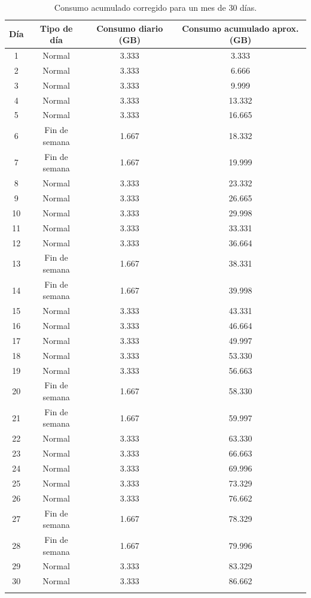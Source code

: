 \documentclass[12pt,a4paper]{article}
\begin{document}
\begin{center}
		\begin{longtable}{|c|c|c|c|}
			\hline
			\rowcolor{azulclaro}
			\textbf{Día} & \textbf{Tipo de día} & \textbf{Consumo diario (GB)} & \textbf{Consumo acumulado aprox. (GB)} \\ \hline
			1 & Normal & 3.333 & 3.333 \\ \hline
			2 & Normal & 3.333 & 6.666 \\ \hline
			3 & Normal & 3.333 & 9.999 \\ \hline
			4 & Normal & 3.333 & 13.332 \\ \hline
			5 & Normal & 3.333 & 16.665 \\ \hline
			6 & Fin de semana & 1.667 & 18.332 \\ \hline
			7 & Fin de semana & 1.667 & 19.999 \\ \hline
			8 & Normal & 3.333 & 23.332 \\ \hline
			9 & Normal & 3.333 & 26.665 \\ \hline
			10 & Normal & 3.333 & 29.998 \\ \hline
			11 & Normal & 3.333 & 33.331 \\ \hline
			12 & Normal & 3.333 & 36.664 \\ \hline
			13 & Fin de semana & 1.667 & 38.331 \\ \hline
			14 & Fin de semana & 1.667 & 39.998 \\ \hline
			15 & Normal & 3.333 & 43.331 \\ \hline
			16 & Normal & 3.333 & 46.664 \\ \hline
			17 & Normal & 3.333 & 49.997 \\ \hline
			18 & Normal & 3.333 & 53.330 \\ \hline
			19 & Normal & 3.333 & 56.663 \\ \hline
			20 & Fin de semana & 1.667 & 58.330 \\ \hline
			21 & Fin de semana & 1.667 & 59.997 \\ \hline
			22 & Normal & 3.333 & 63.330 \\ \hline
			23 & Normal & 3.333 & 66.663 \\ \hline
			24 & Normal & 3.333 & 69.996 \\ \hline
			25 & Normal & 3.333 & 73.329 \\ \hline
			26 & Normal & 3.333 & 76.662 \\ \hline
			27 & Fin de semana & 1.667 & 78.329 \\ \hline
			28 & Fin de semana & 1.667 & 79.996 \\ \hline
			29 & Normal & 3.333 & 83.329 \\ \hline
			30 & Normal & 3.333 & 86.662 \\ \hline
			\caption{Consumo acumulado corregido para un mes de 30 días.}
		\end{longtable}
		

\end{center}
\end{document}
